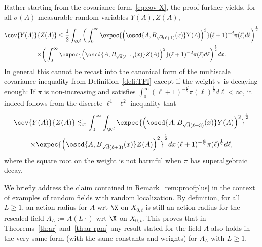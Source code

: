 \begin{rema}\label{rem:cov-alm}
Rather starting from the covariance form~\eqref{eq:cov-X}, the proof further yields, for all $\sigma(A)$-measurable random variables $Y(A),Z(A)$,
\begin{multline*}
\cov{Y(A)}{Z(A)}\le \frac12\int_{\R^d}\bigg(\int_0^\infty\expec{\Big(\oscd{A,B_{\sqrt d(\ell+1)}(x)}Y(A)\Big)^2}(\ell+1)^{-d}\pi(\ell) d\ell\bigg)^\frac12\\
\times\bigg(\int_0^\infty\expec{\Big(\oscd{A,B_{\sqrt d(\ell+1)}(x)}Z(A)\Big)^2}(\ell+1)^{-d}\pi(\ell) d\ell\bigg)^\frac12dx.
\end{multline*}
In general this cannot be recast into the canonical form of the multiscale covariance inequality from Definition~\ref{defi:TFI} except if the weight $\pi$ is decaying enough: If $\pi$ is non-increasing and satisfies $\int_0^\infty(\ell+1)^{-\frac d2}\pi(\ell)^\frac12d\ell<\infty$, it indeed follows from the discrete $\ell^1$--$\ell^2$ inequality that
\begin{multline*}
\cov{Y(A)}{Z(A)}\lesssim_\pi \int_0^\infty\int_{\R^d}\expec{\Big(\oscd{A,B_{\sqrt d(\ell+3)}(x)}Y(A)\Big)^2}^\frac12\\
\times \expec{\Big(\oscd{A,B_{\sqrt d(\ell+3)}(x)}Z(A)\Big)^2}^\frac12dx\,(\ell+1)^{-\frac d2}\pi(\ell)^\frac12 d\ell,
\end{multline*}
where the square root on the weight is not harmful when $\pi$ has superalgebraic decay.
\end{rema}

\begin{rema}\label{rem:rescale-1}
We briefly address the claim contained in Remark~\ref{rem:proofplus} in the context of examples of random fields with random localization. By definition, for all $L\ge1$, an action radius for $A$ wrt $\X$ on $X_{0,t}$ is still an action radius for the rescaled field $A_L:=A(L\cdot)$ wrt $\X$ on $X_{0,t}$. This proves that in Theorems~\ref{th:ar} and~\ref{th:ar-rpm} any result stated for the field $A$ also holds in the very same form (with the same constants and weights) for $A_L$ with $L\ge1$.
\end{rema}

